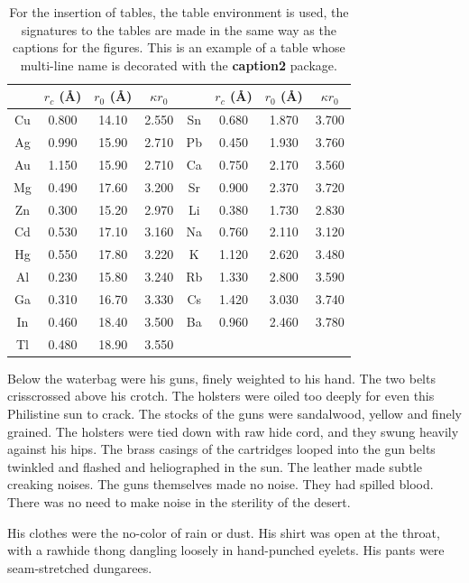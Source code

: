 \documentclass[
11pt,%
tightenlines,%
twoside,%
onecolumn,%
nofloats,%
nobibnotes,%
nofootinbib,%
superscriptaddress,%
noshowpacs,%
centertags]%
{revtex4}
\begin{document}
\begin{table}[!h]
\setcaptionmargin{0mm}
\onelinecaptionsfalse
{}
\caption{ For the insertion of tables, the table environment is used,
 the signatures to the tables are made in the same way as the captions
 for the figures. This is an example of a table whose multi-line name
 is decorated with the \textbf{caption2} package.}
\bigskip
\begin{tabular}{|c|c|c|c|c|c|c|c|}
\hline
 &$r_c$ (\AA)&$r_0$ (\AA)&$\kappa r_0$&
 &$r_c$ (\AA) &$r_0$ (\AA)&$\kappa r_0$\\
\hline
Cu& 0.800 & 14.10 & 2.550 &Sn
& 0.680 & 1.870 & 3.700 \\
Ag& 0.990 & 15.90 & 2.710 &Pb
& 0.450 & 1.930 & 3.760 \\
Au& 1.150 & 15.90 & 2.710 &Ca
& 0.750 & 2.170 & 3.560 \\
Mg& 0.490 & 17.60 & 3.200 &Sr
& 0.900 & 2.370 & 3.720 \\
Zn& 0.300 & 15.20 & 2.970 &Li
& 0.380 & 1.730 & 2.830 \\
Cd& 0.530 & 17.10 & 3.160 &Na
& 0.760 & 2.110 & 3.120 \\
Hg& 0.550 & 17.80 & 3.220 &K &  1.120 & 2.620 & 3.480 \\
Al& 0.230 & 15.80 & 3.240 &Rb & 1.330 & 2.800 & 3.590 \\
Ga& 0.310 & 16.70 & 3.330 &Cs & 1.420 & 3.030 & 3.740 \\
In& 0.460 & 18.40 & 3.500 &Ba & 0.960 & 2.460 & 3.780 \\
Tl& 0.480 & 18.90 & 3.550 & & & & \\[1mm]
\hline
\end{tabular}
\end{table}

Below the waterbag were his guns, finely weighted to his hand. The two belts crisscrossed above his crotch. The holsters were oiled too deeply for even this Philistine sun to crack. The stocks of the guns were sandalwood, yellow and finely grained. The holsters were tied down with raw hide cord, and they swung heavily against his hips. The brass casings of the cartridges looped into the gun belts twinkled and flashed and heliographed in the sun. The leather made subtle creaking noises. The guns themselves made no noise. They had spilled blood. There was no need to make noise in the sterility of the desert.

His clothes were the no-color of rain or dust. His shirt was open at the throat, with a rawhide thong dangling loosely in hand-punched eyelets. His pants were seam-stretched dungarees.
\end{document}
